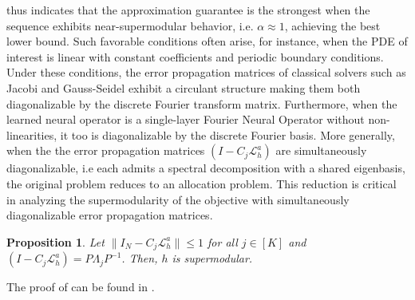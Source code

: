 \documentclass{article} %
\newtheorem{proposition}[theorem]{Proposition}
\begin{document}

 thus indicates that the approximation guarantee is the strongest when the sequence exhibits near-supermodular behavior, i.e. $\alpha \approx 1$, achieving the best lower bound. Such favorable conditions often arise, for instance, when the PDE of interest is linear with constant coefficients and periodic boundary conditions. Under these conditions, the error propagation matrices of classical solvers such as Jacobi and Gauss-Seidel exhibit a circulant structure making them both diagonalizable by the discrete Fourier transform matrix. Furthermore, when the learned neural operator is a single-layer Fourier Neural Operator without non-linearities, it too is diagonalizable by the discrete Fourier basis. More generally, when the the error propagation matrices $\left(I - C_j \mathcal{L}_{h}^a\right)$ are simultaneously diagonalizable, i.e each admits a spectral decomposition with a shared eigenbasis, the original problem reduces to an allocation problem. This reduction is critical in analyzing the supermodularity of the objective with simultaneously diagonalizable error propagation matrices.
\begin{proposition} \label{th:simultaneoussupermodular}
    Let $\|I_N - C_j\mathcal{L}_h^a\| \leq 1$ for all $j \in [K]$ and $\left(I - C_j \mathcal{L}_{h}^a\right) = P\Lambda_jP^{-1}$. Then, $h$ is supermodular. 
\end{proposition}
The proof of  can be found in .
\end{document}
